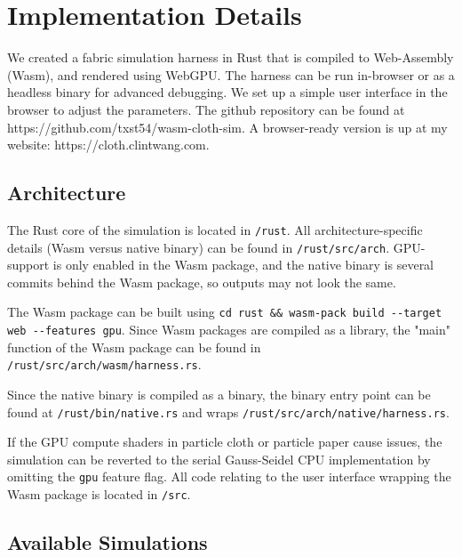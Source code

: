 \documentclass{article}
\begin{document}
\section{Implementation Details}

We created a fabric simulation harness in Rust that is compiled to Web-Assembly (Wasm), and rendered using WebGPU. The harness can be run in-browser or as a headless binary for advanced debugging. We set up a simple user interface in the browser to adjust the parameters. The github repository can be found at https://github.com/txst54/wasm-cloth-sim. A browser-ready version is up at my website: https://cloth.clintwang.com. 

\subsection{Architecture}
The Rust core of the simulation is located in \verb|/rust|. All architecture-specific details (Wasm versus native binary) can be found in \verb|/rust/src/arch|. GPU-support is only enabled in the Wasm package, and the native binary is several commits behind the Wasm package, so outputs may not look the same. 

The Wasm package can be built using \verb|cd rust && wasm-pack build --target web --features gpu|. Since Wasm packages are compiled as a library, the "main" function of the Wasm package can be found in \verb|/rust/src/arch/wasm/harness.rs|. 

Since the native binary is compiled as a binary, the binary entry point can be found at \verb|/rust/bin/native.rs| and wraps \verb|/rust/src/arch/native/harness.rs|. 

If the GPU compute shaders in particle cloth or particle paper cause issues, the simulation can be reverted to the serial Gauss-Seidel CPU implementation by omitting the \verb|gpu| feature flag. All code relating to the user interface wrapping the Wasm package is located in \verb|/src|. 

\subsection{Available Simulations}
\end{document}
